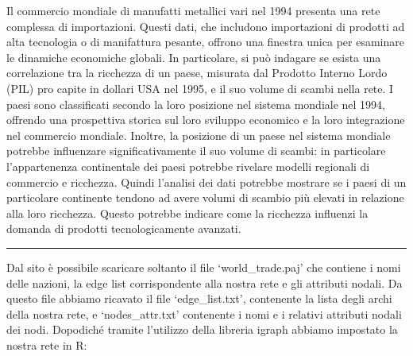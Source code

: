\documentclass[11pt]{article}
\begin{document}
Il commercio mondiale di manufatti metallici vari nel 1994 presenta una
rete complessa di importazioni. Questi dati, che includono importazioni
di prodotti ad alta tecnologia o di manifattura pesante, offrono una
finestra unica per esaminare le dinamiche economiche globali. In
particolare, si può indagare se esista una correlazione tra la ricchezza
di un paese, misurata dal Prodotto Interno Lordo (PIL) pro capite in
dollari USA nel 1995, e il suo volume di scambi nella rete. I paesi sono
classificati secondo la loro posizione nel sistema mondiale nel 1994,
offrendo una prospettiva storica sul loro sviluppo economico e la loro
integrazione nel commercio mondiale. Inoltre, la posizione di un paese
nel sistema mondiale potrebbe influenzare significativamente il suo
volume di scambi: in particolare l'appartenenza continentale dei paesi
potrebbe rivelare modelli regionali di commercio e ricchezza. Quindi
l'analisi dei dati potrebbe mostrare se i paesi di un particolare
continente tendono ad avere volumi di scambio più elevati in relazione
alla loro ricchezza. Questo potrebbe indicare come la ricchezza
influenzi la domanda di prodotti tecnologicamente avanzati.

\begin{center}\rule{0.5\linewidth}{0.5pt}\end{center}

Dal sito è possibile scaricare soltanto il file `world\_trade.paj' che
contiene i nomi delle nazioni, la edge list corrispondente alla nostra
rete e gli attributi nodali. Da questo file abbiamo ricavato il file
`edge\_list.txt', contenente la lista degli archi della nostra rete, e
`nodes\_attr.txt' contenente i nomi e i relativi attributi nodali dei
nodi. Dopodiché tramite l'utilizzo della libreria igraph abbiamo
impostato la nostra rete in R:
\end{document}
